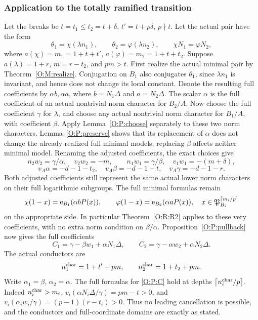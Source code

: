 \documentclass[11pt]{amsart}
\theoremstyle{definition}
\theoremstyle{remark}
\newcommand{\ceil}[1]{\left\lceil #1\right\rceil}
\newcommand{\ee}{\mathrm e}\newcommand{\echar}{\mathrm e}\newcommand{\FF}{\mathbf F}
\begin{document}
\subsubsection*{Application to the totally ramified transition}
Let the breaks be $t=t_1\le t_2=t+\delta$, $t'=t+p\delta$, $p\nmid t$.
Let the actual pair have the form
\[
 \theta_1=\chi(\lambda n_1),\qquad
 \theta_2=\varphi(\lambda n_2),\qquad
 \chi N_1=\varphi N_2,
\]
where $a(\chi)=m_1=1+t+t'$, $a(\varphi)=m_2=1+t+t_2$.
Suppose $a(\lambda)=1+r$, $m=r-t_2$, and $pm>t$.
First realize the actual minimal pair by Theorem~\ref{O:M:realize}.
Conjugation on $B_1$ also conjugates $\theta_1$, since $\lambda n_1$ is
invariant, and hence does not change its local constant. Denote the resulting
full coefficients by $\alpha b,\alpha a$, where $b=N_1\Delta$ and
$a=N_2\Delta$. The scalar $\alpha$ is the full coefficient of an actual
nontrivial norm character for $B_2/A$.
Now choose the full coefficient $\gamma$ for $\lambda$, and choose any
actual nontrivial norm character for $B_1/A$, with coefficient $\beta$.
Apply Lemma~\ref{O:P:choose} separately to these two norm characters.
Lemma~\ref{O:P:preserve} shows that its replacement of $\alpha$ does not change
the already realized full minimal models; replacing $\beta$ affects neither
minimal model. Renaming the adjusted coefficients, the exact choices give
\begin{equation}\label{O:P:parameters}
 n_2w_2=\gamma/\alpha,\quad v_2w_2=-m,\qquad
 n_1w_1=\gamma/\beta,\quad v_1w_1=-(m+\delta),
\end{equation}
\[
 v_A\alpha=-d-1-t_2,\quad
 v_A\beta=-d-1-t,\quad v_A\gamma=-d-1-r.
\]
Both adjusted coefficients still represent the same actual lower norm
characters on their full logarithmic subgroups. The full minimal formulas
remain
\[
 \chi(1-x)=\ee_{B_1}(\alpha bP(x)),\qquad
 \varphi(1-x)=\ee_{B_2}(\alpha aP(x)),\quad
 x\in\PP_{B_i}^{\lceil m_i/p\rceil}
\]
on the appropriate side. In particular Theorem~\ref{O:R:R2} applies to these
very coefficients, with no extra norm condition on $\beta/\alpha$.
Proposition~\ref{O:P:pullback} now gives the full coefficients
\begin{equation}\label{O:P:C}
 C_1=\gamma-\beta w_1+\alpha N_1\Delta,\qquad
 C_2=\gamma-\alpha w_2+\alpha N_2\Delta.
\end{equation}
The actual conductors are
\[
 n_1^{\rm char}=1+t'+pm,
 \qquad n_2^{\rm char}=1+t_2+pm.
\]
Write $\alpha_1=\beta$, $\alpha_2=\alpha$.
The full formulas for \eqref{O:P:C} hold at depths
$\ceil{n_i^{\rm char}/p}$. Indeed $n_i^{\rm char}>m_i$,
$v_i(\alpha N_i\Delta/\gamma)=pm-t>0$, and
$v_i(\alpha_iw_i/\gamma)=(p-1)(r-t_i)>0$.
Thus no leading cancellation is possible, and the conductors and
full-coordinate domains are exactly as stated.
\end{document}
